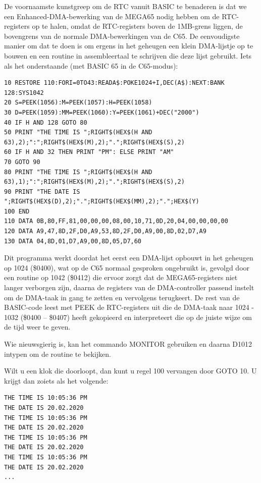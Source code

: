 De voornaamste kunstgreep om de RTC vanuit BASIC te benaderen is dat we een Enhanced-DMA-bewerking van de MEGA65 nodig hebben om de RTC-registers op te halen, omdat de RTC-registers boven de 1MB-grens liggen, de bovengrens van de normale DMA-bewerkingen van de C65. De eenvoudigste manier om dat te doen is om ergens in het geheugen een klein DMA-lijstje op te bouwen en een routine in assembleertaal te schrijven die deze lijst gebruikt. Iets als het onderstaande (met BASIC 65 in de C65-modus):

\begin{tcolorbox}[colback=black,coltext=white]
\verbatimfont{\codefont}
\begin{verbatim}
10 RESTORE 110:FORI=0TO43:READA$:POKE1024+I,DEC(A$):NEXT:BANK 128:SYS1042
20 S=PEEK(1056):M=PEEK(1057):H=PEEK(1058)
30 D=PEEK(1059):MM=PEEK(1060):Y=PEEK(1061)+DEC("2000")
40 IF H AND 128 GOTO 80
50 PRINT "THE TIME IS ";RIGHT$(HEX$(H AND 63),2);":";RIGHT$(HEX$(M),2);".";RIGHT$(HEX$(S),2)
60 IF H AND 32 THEN PRINT "PM": ELSE PRINT "AM"
70 GOTO 90
80 PRINT "THE TIME IS ";RIGHT$(HEX$(H AND 63),1);":";RIGHT$(HEX$(M),2);".";RIGHT$(HEX$(S),2)
90 PRINT "THE DATE IS ";RIGHT$(HEX$(D),2);".";RIGHT$(HEX$(MM),2);".";HEX$(Y)
100 END
110 DATA 0B,80,FF,81,00,00,00,08,00,10,71,0D,20,04,00,00,00,00
120 DATA A9,47,8D,2F,D0,A9,53,8D,2F,D0,A9,00,8D,02,D7,A9
130 DATA 04,8D,01,D7,A9,00,8D,05,D7,60
\end{verbatim}
\end{tcolorbox}


Dit programma werkt doordat het eerst een DMA-lijst opbouwt in het geheugen op 1024 (\$0400), wat op de C65 normaal gesproken ongebruikt is, gevolgd door een routine op 1042 (\$0412) die ervoor zorgt dat de MEGA65-registers niet langer verborgen zijn, daarna de registers van de DMA-controller passend instelt om de DMA-taak in gang te zetten en vervolgens terugkeert. De rest van de BASIC-code leest met PEEK de RTC-registers uit die de DMA-taak naar 1024 - 1032 (\$0400 -- \$0407) heeft gekopieerd en interpreteert die op de juiste wijze om de tijd weer te geven.

Wie nieuwsgierig is, kan het commando MONITOR gebruiken en daarna D1012 intypen om de routine te bekijken.

Wilt u een klok die doorloopt, dan kunt u regel 100 vervangen door GOTO 10. U krijgt dan zoiets als het volgende:

\begin{tcolorbox}[colback=black,coltext=white]
\verbatimfont{\codefont}
\begin{verbatim}
THE TIME IS 10:05:36 PM
THE DATE IS 20.02.2020
THE TIME IS 10:05:36 PM
THE DATE IS 20.02.2020
THE TIME IS 10:05:36 PM
THE DATE IS 20.02.2020
THE TIME IS 10:05:36 PM
THE DATE IS 20.02.2020
...
\end{verbatim}
\end{tcolorbox}


